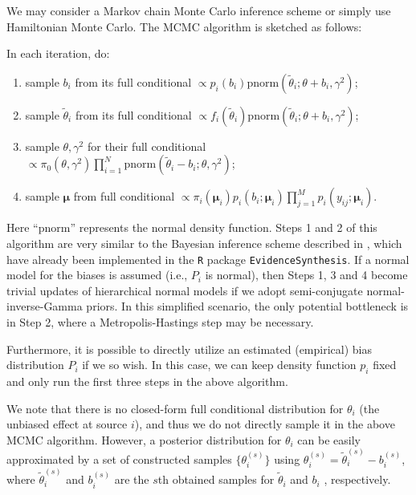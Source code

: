 \documentclass{article}
\begin{document}
We may consider a Markov chain Monte Carlo inference scheme or simply use Hamiltonian Monte Carlo. The MCMC algorithm is sketched as follows:

In each iteration, do:
\begin{enumerate}
    \item sample $b_i$ from its full conditional $\propto p_i(b_i)\text{pnorm}(\tilde\theta_i; \theta+b_i, \gamma^2)$;
    \item sample $\tilde\theta_i$ from its full conditional $\propto f_i(\tilde\theta_i)\text{pnorm}(\tilde\theta_i; \theta+b_i, \gamma^2)$;
    \item sample $\theta, \gamma^2$ for their full conditional $\propto \pi_0(\theta, \gamma^2) \prod_{i=1}^N \text{pnorm}(\tilde\theta_i-b_i; \theta, \gamma^2)$;
    \item sample $\boldsymbol\mu$ from full conditional $\propto \pi_i(\boldsymbol\mu_i) p_i(b_i; \boldsymbol\mu_i) \prod_{j=1}^M p_i(y_{ij}; \boldsymbol\mu_i)$.
\end{enumerate}
Here ``$\text{pnorm}$'' represents the normal density function.
Steps 1 and 2 of this algorithm are very similar to the Bayesian inference scheme described in \cite{schuemie2021combining}, which have already been implemented in the \texttt{R} package \texttt{EvidenceSynthesis}. 
If a normal model for the biases is assumed (i.e., $P_i$ is normal),
then Steps 1, 3 and 4 become trivial updates of hierarchical normal models if we adopt semi-conjugate normal-inverse-Gamma priors.
In this simplified scenario, the only potential bottleneck is in Step 2, where a Metropolis-Hastings step may be necessary.

Furthermore, it is possible to directly utilize an estimated (empirical) bias distribution $P_i$ if we so wish.
In this case, we can keep density function $p_i$ fixed and only run the first three steps in the above algorithm.

We note that there is no closed-form full conditional distribution for $\theta_i$ (the unbiased effect at source $i$), and thus we do not directly sample it in the above MCMC algorithm. 
However, a posterior distribution for $\theta_i$ can be easily approximated by a set of constructed samples $\{\theta_i^{(s)}\}$ using $\theta_i^{(s)} = \tilde\theta_i^{(s)} - b_i^{(s)}$, 
where $\tilde\theta_i^{(s)}$ and $b_i^{(s)}$ are the $s$th obtained samples for $\tilde\theta_i$ and $b_i$ , respectively. 
\end{document}
